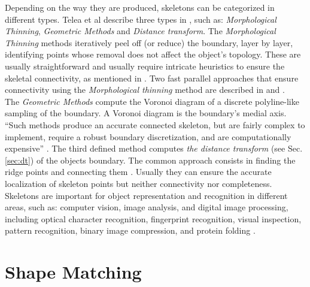 Depending on the way they are produced, skeletons can be categorized in different types.
Telea et al describe three types in \cite{augmented}, such as: \emph{Morphological Thinning},
\emph{Geometric Methods} and \emph{Distance transform}. The \emph{Morphological Thinning} methods iteratively peel off (or reduce) the boundary, layer by layer, identifying
points whose removal does not affect the object's topology. These are usually 
straightforward and usually require intricate heuristics to ensure the skeletal
connectivity, as mentioned in \cite{augmented}. Two fast parallel approaches that
ensure connectivity using the \emph{Morphological thinning} method are described
in \cite{onepass} and \cite{thinning}.\\
The \emph{Geometric Methods} compute the Voronoi diagram of a discrete polyline-like
sampling of the boundary. A Voronoi diagram is the boundary's medial axis. ``Such 
methods produce an accurate connected skeleton, but are fairly complex to implement,
require a robust boundary discretization, and are computationally expensive''
\cite[p.251]{augmented}. The third defined method computes \emph{the distance transform}
(see Sec. \ref{sec:dt}) of the objects boundary. The common approach consists in
finding the ridge points and connecting them \cite{maxima,euclideancentre,ridgedt}.
 Usually they can ensure the accurate localization of skeleton points 
but neither connectivity nor completeness.\\

Skeletons are important for object representation and recognition in different areas,
such as: computer vision, image analysis, and digital image processing, 
including optical character recognition, fingerprint recognition, visual inspection,
pattern recognition, binary image compression, and protein folding \cite{skprotein}.


\section{Shape Matching}
\label{sec:shapefitting}

